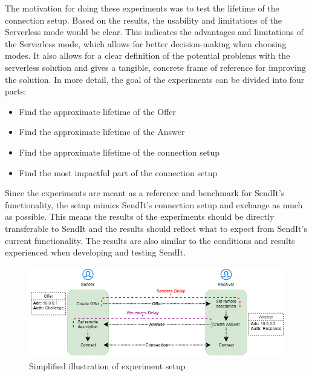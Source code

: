 The motivation for doing these experiments was to test the lifetime of the connection setup. Based on the results, the usability and limitations of the Serverless mode would be clear. This indicates the advantages and limitations of the Serverless mode, which allows for better decision-making when choosing modes. It also allows for a clear definition of the potential problems with the serverless solution and gives a tangible, concrete frame of reference for improving the solution.
In more detail, the goal of the experiments can be divided into four parts:
%
\begin{itemize}
	\item Find the approximate lifetime of the Offer
	\item Find the approximate lifetime of the Answer
	\item Find the approximate lifetime of the connection setup
	\item Find the most impactful part of the connection setup
\end{itemize}
%
Since the experiments are meant as a reference and benchmark for SendIt's functionality, the setup mimics SendIt's connection setup and exchange as much as possible. This means the results of the experiments should be directly transferable to SendIt and the results should reflect what to expect from SendIt's current functionality. The results are also similar to the conditions and results experienced when developing and testing SendIt.
%
%
\begin{figure}[th]
  \centering
  \includegraphics[width=\textwidth]{Figures/Terms}
  \decoRule
  \caption[Experiment terminology]{Simplified illustration of experiment setup}
  \label{fig:terms}
\end{figure}
%
